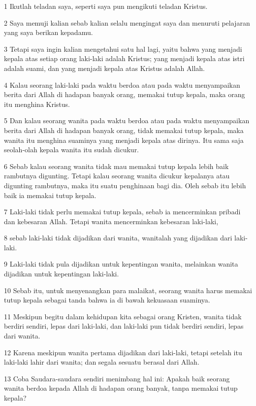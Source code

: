 \par 1 Ikutlah teladan saya, seperti saya pun mengikuti teladan Kristus.
\par 2 Saya memuji kalian sebab kalian selalu mengingat saya dan menuruti pelajaran yang saya berikan kepadamu.
\par 3 Tetapi saya ingin kalian mengetahui satu hal lagi, yaitu bahwa yang menjadi kepala atas setiap orang laki-laki adalah Kristus; yang menjadi kepala atas istri adalah suami, dan yang menjadi kepala atas Kristus adalah Allah.
\par 4 Kalau seorang laki-laki pada waktu berdoa atau pada waktu menyampaikan berita dari Allah di hadapan banyak orang, memakai tutup kepala, maka orang itu menghina Kristus.
\par 5 Dan kalau seorang wanita pada waktu berdoa atau pada waktu menyampaikan berita dari Allah di hadapan banyak orang, tidak memakai tutup kepala, maka wanita itu menghina suaminya yang menjadi kepala atas dirinya. Itu sama saja seolah-olah kepala wanita itu sudah dicukur.
\par 6 Sebab kalau seorang wanita tidak mau memakai tutup kepala lebih baik rambutnya digunting. Tetapi kalau seorang wanita dicukur kepalanya atau digunting rambutnya, maka itu suatu penghinaan bagi dia. Oleh sebab itu lebih baik ia memakai tutup kepala.
\par 7 Laki-laki tidak perlu memakai tutup kepala, sebab ia mencerminkan pribadi dan kebesaran Allah. Tetapi wanita mencerminkan kebesaran laki-laki,
\par 8 sebab laki-laki tidak dijadikan dari wanita, wanitalah yang dijadikan dari laki-laki.
\par 9 Laki-laki tidak pula dijadikan untuk kepentingan wanita, melainkan wanita dijadikan untuk kepentingan laki-laki.
\par 10 Sebab itu, untuk menyenangkan para malaikat, seorang wanita harus memakai tutup kepala sebagai tanda bahwa ia di bawah kekuasaan suaminya.
\par 11 Meskipun begitu dalam kehidupan kita sebagai orang Kristen, wanita tidak berdiri sendiri, lepas dari laki-laki, dan laki-laki pun tidak berdiri sendiri, lepas dari wanita.
\par 12 Karena meskipun wanita pertama dijadikan dari laki-laki, tetapi setelah itu laki-laki lahir dari wanita; dan segala sesuatu berasal dari Allah.
\par 13 Coba Saudara-saudara sendiri menimbang hal ini: Apakah baik seorang wanita berdoa kepada Allah di hadapan orang banyak, tanpa memakai tutup kepala?
